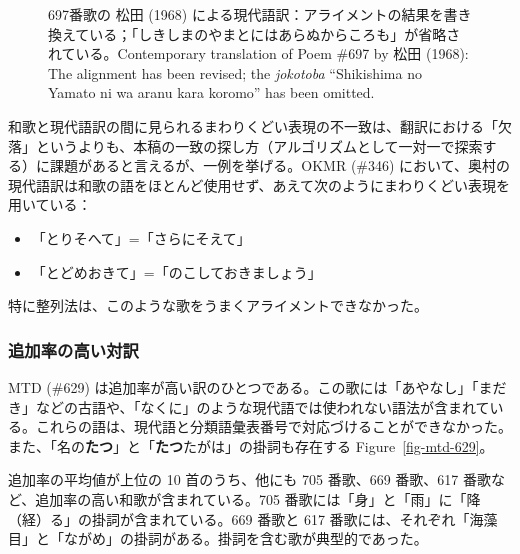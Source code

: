 \documentclass[
  letterpaper,
  DIV=11,
  numbers=noendperiod]{scrartcl}
\providecommand{\tightlist}{%
  \setlength{\itemsep}{0pt}\setlength{\parskip}{0pt}}\usepackage{longtable,booktabs,array}
\begin{document}
\begin{figure}


\caption{\label{fig-mtd-697}697番歌の 松田 (1968)
による現代語訳：アライメントの結果を書き換えている；「しきしまのやまとにはあらぬからころも」が省略されている。Contemporary
translation of Poem \#697 by 松田 (1968): The alignment has been
revised; the \emph{jokotoba} ``Shikishima no Yamato ni wa aranu kara
koromo'' has been omitted.}

\end{figure}%

和歌と現代語訳の間に見られるまわりくどい表現の不一致は、翻訳における「欠落」というよりも、本稿の一致の探し方（アルゴリズムとして一対一で探索する）に課題があると言えるが、一例を挙げる。OKMR
(\#346)
において、奥村の現代語訳は和歌の語をほとんど使用せず、あえて次のようにまわりくどい表現を用いている：

\begin{itemize}
\tightlist
\item
  「とりそへて」=「さらにそえて」
\item
  「とどめおきて」=「のこしておきましょう」
\end{itemize}

特に整列法は、このような歌をうまくアライメントできなかった。

\subsubsection*{追加率の高い対訳}\label{ux8ffdux52a0ux7387ux306eux9ad8ux3044ux5bfeux8a33}

MTD (\#629)
は追加率が高い訳のひとつである。この歌には「あやなし」「まだき」などの古語や、「なくに」のような現代語では使われない語法が含まれている。これらの語は、現代語と分類語彙表番号で対応づけることができなかった。また、「名の\textbf{たつ}」と「\textbf{たつ}たがは」の掛詞も存在する
Figure~\ref{fig-mtd-629}。

追加率の平均値が上位の 10 首のうち、他にも 705 番歌、669 番歌、617
番歌など、追加率の高い和歌が含まれている。705
番歌には「身」と「雨」に「降（経）る」の掛詞が含まれている。669 番歌と
617
番歌には、それぞれ「海藻目」と「ながめ」の掛詞がある。掛詞を含む歌が典型的であった。
\end{document}

